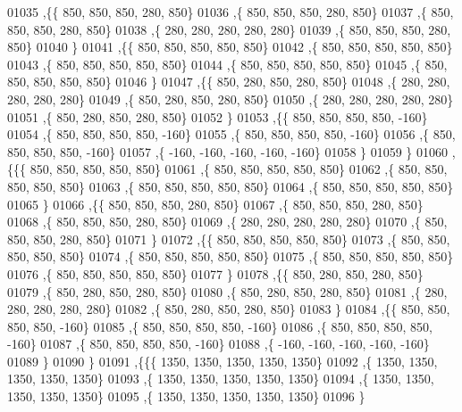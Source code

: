 \begin{DoxyCode}
01035   ,\{\{   850,   850,   850,   280,   850\}
01036    ,\{   850,   850,   850,   280,   850\}
01037    ,\{   850,   850,   850,   280,   850\}
01038    ,\{   280,   280,   280,   280,   280\}
01039    ,\{   850,   850,   850,   280,   850\}
01040    \}
01041   ,\{\{   850,   850,   850,   850,   850\}
01042    ,\{   850,   850,   850,   850,   850\}
01043    ,\{   850,   850,   850,   850,   850\}
01044    ,\{   850,   850,   850,   850,   850\}
01045    ,\{   850,   850,   850,   850,   850\}
01046    \}
01047   ,\{\{   850,   280,   850,   280,   850\}
01048    ,\{   280,   280,   280,   280,   280\}
01049    ,\{   850,   280,   850,   280,   850\}
01050    ,\{   280,   280,   280,   280,   280\}
01051    ,\{   850,   280,   850,   280,   850\}
01052    \}
01053   ,\{\{   850,   850,   850,   850,  -160\}
01054    ,\{   850,   850,   850,   850,  -160\}
01055    ,\{   850,   850,   850,   850,  -160\}
01056    ,\{   850,   850,   850,   850,  -160\}
01057    ,\{  -160,  -160,  -160,  -160,  -160\}
01058    \}
01059   \}
01060  ,\{\{\{   850,   850,   850,   850,   850\}
01061    ,\{   850,   850,   850,   850,   850\}
01062    ,\{   850,   850,   850,   850,   850\}
01063    ,\{   850,   850,   850,   850,   850\}
01064    ,\{   850,   850,   850,   850,   850\}
01065    \}
01066   ,\{\{   850,   850,   850,   280,   850\}
01067    ,\{   850,   850,   850,   280,   850\}
01068    ,\{   850,   850,   850,   280,   850\}
01069    ,\{   280,   280,   280,   280,   280\}
01070    ,\{   850,   850,   850,   280,   850\}
01071    \}
01072   ,\{\{   850,   850,   850,   850,   850\}
01073    ,\{   850,   850,   850,   850,   850\}
01074    ,\{   850,   850,   850,   850,   850\}
01075    ,\{   850,   850,   850,   850,   850\}
01076    ,\{   850,   850,   850,   850,   850\}
01077    \}
01078   ,\{\{   850,   280,   850,   280,   850\}
01079    ,\{   850,   280,   850,   280,   850\}
01080    ,\{   850,   280,   850,   280,   850\}
01081    ,\{   280,   280,   280,   280,   280\}
01082    ,\{   850,   280,   850,   280,   850\}
01083    \}
01084   ,\{\{   850,   850,   850,   850,  -160\}
01085    ,\{   850,   850,   850,   850,  -160\}
01086    ,\{   850,   850,   850,   850,  -160\}
01087    ,\{   850,   850,   850,   850,  -160\}
01088    ,\{  -160,  -160,  -160,  -160,  -160\}
01089    \}
01090   \}
01091  ,\{\{\{  1350,  1350,  1350,  1350,  1350\}
01092    ,\{  1350,  1350,  1350,  1350,  1350\}
01093    ,\{  1350,  1350,  1350,  1350,  1350\}
01094    ,\{  1350,  1350,  1350,  1350,  1350\}
01095    ,\{  1350,  1350,  1350,  1350,  1350\}
01096    \}

\end{DoxyCode}

